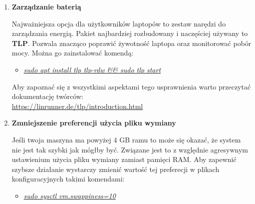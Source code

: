 \documentclass[10pt,a4paper]{article}
\begin{document}
\begin{enumerate}
\item \textbf{Zarządzanie baterią} \par Najważniejsza opcja dla użytkowników laptopów to zestaw narędzi do zarządzania energią. Pakiet najbardziej rozbudowany i naczęściej używany to \textbf{TLP}. Pozwala znacząco poprawić żywotność laptopa oraz monitorować pobór mocy. Można go zainstalować komendą:
\begin{itemize}
\item \textsl{\underline{sudo apt install tlp tlp-rdw \&\& sudo tlp start}}\par
\end{itemize}
Aby zapoznać się z wszystkimi aspektami tego usprawnienia warto przeczytać dokumentację twórców:\\\url{https://linrunner.de/tlp/introduction.html}\\

\item \textbf{Zmniejszenie preferencji użycia pliku wymiany}\par Jeśli twoja maszyna ma powyżej 4 GB ramu to może się okazać, że system nie jest tak szybki jak mógłby być. Związane jest to z względnie agresywnym ustawienium użycia pliku wymiany zamiast pamięci RAM. Aby zapewnić szybsze działanie wystarczy zmienić wartość tej preferecji w plikach konfiguracyjnych takimi komendami:
\begin{itemize}
\item \textsl{\underline{sudo sysctl vm.swappiness=10}}\\\\\\\\
\end{itemize}

\end{enumerate}
\end{document}
